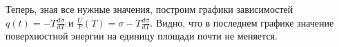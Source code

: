 \documentclass[a4paper, 12pt]{article} %
\begin{document}
Теперь, зная все нужные значения, построим графики зависимостей $q(t) = -T \frac{d \sigma}{dT}$ и $\frac{U}{F}(T) = \sigma - T\frac{d \sigma}{dT}$. Видно, что в последнем графике значение поверхностной энергии на единицу площади почти не меняется.

\begin{figure}[h]
    \label{gr:2}
\end{figure}

\begin{figure}[h]
    \label{gr:3}
\end{figure}
\end{document}
